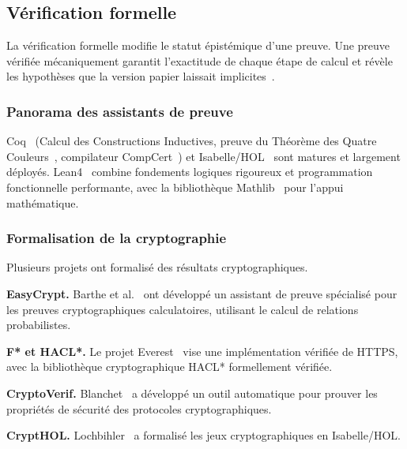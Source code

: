 \subsection{V\'erification formelle}
\label{subsec:verification_formelle}
\begin{sloppypar}
La v\'erification formelle
modifie le statut \'epist\'emique d'une preuve. Une preuve
v\'erifi\'ee m\'ecaniquement garantit l'exactitude de chaque \'etape de calcul et r\'ev\`ele
les hypoth\`eses que la version papier laissait implicites~\cite{Wiedijk2007}.

\subsubsection{Panorama des assistants de preuve}
\label{subsubsec:assistants_preuve}

Coq~\cite{Coq} (Calcul des Constructions Inductives, preuve du Th\'eor\`eme
des Quatre Couleurs~\cite{Gonthier08}, compilateur CompCert~\cite{Leroy09}) et Isabelle/HOL~\cite{Isabelle}
sont matures et largement d\'eploy\'es. Lean4~\cite{Lean4,moura2015lean} combine fondements
logiques rigoureux et programmation fonctionnelle performante, avec la
biblioth\`eque Mathlib~\cite{Mathlib} pour l'appui math\'ematique.

\subsubsection{Formalisation de la cryptographie}
\label{subsubsec:formalisation_crypto}

Plusieurs projets ont formalis\'e des r\'esultats cryptographiques.

\textbf{EasyCrypt.} Barthe et al.~\cite{BartheEA2013} ont d\'evelopp\'e un assistant
de preuve sp\'ecialis\'e pour les preuves cryptographiques calculatoires,
utilisant le calcul de relations probabilistes.

\textbf{F* et HACL*.} Le projet Everest~\cite{BhargavanEA2017,FStar,HACL} vise
une impl\'ementation v\'erifi\'ee de HTTPS, avec la biblioth\`eque cryptographique
HACL* formellement v\'erifi\'ee.

\textbf{CryptoVerif.} Blanchet~\cite{CryptoVerif} a d\'evelopp\'e un outil automatique
pour prouver les propri\'et\'es de s\'ecurit\'e des protocoles cryptographiques.

\textbf{CryptHOL.} Lochbihler~\cite{Lochbihler2016} a formalis\'e les jeux
cryptographiques en Isabelle/HOL.


\end{sloppypar}
